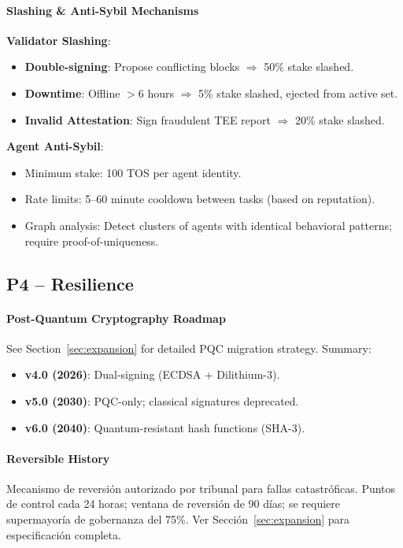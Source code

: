 \documentclass[11pt]{article}
\begin{document}
\paragraph{Slashing \& Anti-Sybil Mechanisms}
\textbf{Validator Slashing}:
\begin{itemize}[noitemsep]
  \item \textbf{Double-signing}: Propose conflicting blocks $\Rightarrow$ 50\% stake slashed.
  \item \textbf{Downtime}: Offline $>$6 hours $\Rightarrow$ 5\% stake slashed, ejected from active set.
  \item \textbf{Invalid Attestation}: Sign fraudulent TEE report $\Rightarrow$ 20\% stake slashed.
\end{itemize}

\textbf{Agent Anti-Sybil}:
\begin{itemize}[noitemsep]
  \item Minimum stake: 100 TOS per agent identity.
  \item Rate limits: 5--60 minute cooldown between tasks (based on reputation).
  \item Graph analysis: Detect clusters of agents with identical behavioral patterns; require proof-of-uniqueness.
\end{itemize}

\subsection{P4 -- Resilience}
\label{sec:pillar-resilience}

\paragraph{Post-Quantum Cryptography Roadmap}
See Section~\ref{sec:expansion} for detailed PQC migration strategy. Summary:
\begin{itemize}[noitemsep]
  \item \textbf{v4.0 (2026)}: Dual-signing (ECDSA + Dilithium-3).
  \item \textbf{v5.0 (2030)}: PQC-only; classical signatures deprecated.
  \item \textbf{v6.0 (2040)}: Quantum-resistant hash functions (SHA-3).
\end{itemize}

\paragraph{Reversible History}
Mecanismo de reversión autorizado por tribunal para fallas catastróficas. Puntos de control cada 24 horas; ventana de reversión de 90 días; se requiere supermayoría de gobernanza del 75\%. Ver Sección~\ref{sec:expansion} para especificación completa.
\end{document}
